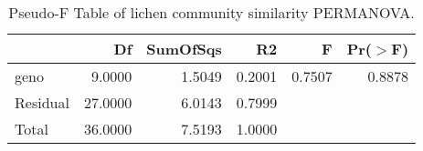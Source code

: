 \begin{table}[ht]
\centering
\begin{tabular}{lrrrrr}
  \hline
 & Df & SumOfSqs & R2 & F & Pr($>$F) \\ 
  \hline
geno & 9.0000 & 1.5049 & 0.2001 & 0.7507 & 0.8878 \\ 
  Residual & 27.0000 & 6.0143 & 0.7999 &  &  \\ 
  Total & 36.0000 & 7.5193 & 1.0000 &  &  \\ 
   \hline
\end{tabular}
\caption{Pseudo-F Table of lichen community similarity PERMANOVA.} 
\label{tab:com_perm}
\end{table}
